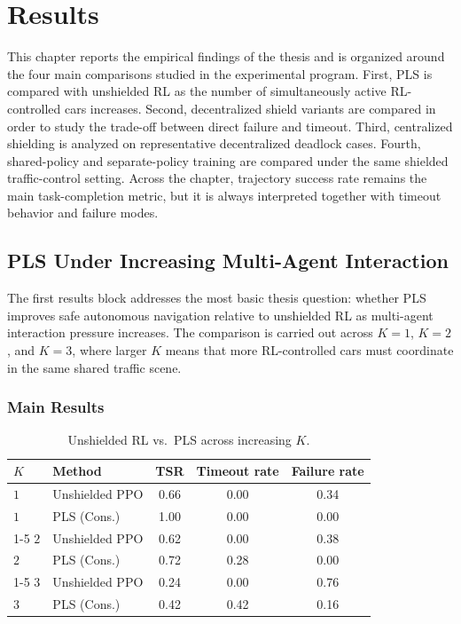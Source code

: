 \chapter{Results}
\label{cha:results}

This chapter reports the empirical findings of the thesis and is organized around the four main comparisons studied in the experimental program. First, PLS is compared with unshielded RL as the number of simultaneously active RL-controlled cars increases. Second, decentralized shield variants are compared in order to study the trade-off between direct failure and timeout. Third, centralized shielding is analyzed on representative decentralized deadlock cases. Fourth, shared-policy and separate-policy training are compared under the same shielded traffic-control setting. Across the chapter, trajectory success rate remains the main task-completion metric, but it is always interpreted together with timeout behavior and failure modes.

\section{PLS Under Increasing Multi-Agent Interaction}
\label{sec:results-rq1}

The first results block addresses the most basic thesis question: whether PLS improves safe autonomous navigation relative to unshielded RL as multi-agent interaction pressure increases. The comparison is carried out across \(K=1\), \(K=2\), and \(K=3\), where larger \(K\) means that more RL-controlled cars must coordinate in the same shared traffic scene.

\subsection{Main Results}
\begin{table}[H]
\centering
\caption{Unshielded RL vs.\ PLS across increasing \(K\).}
\label{tab:results-rq1-main}
\begin{tabular}{llccc}
\toprule
\textbf{\(K\)} & \textbf{Method} & \textbf{TSR} & \textbf{Timeout rate} & \textbf{Failure rate} \\
\midrule
\(1\) & Unshielded PPO & 0.66 & 0.00 & 0.34 \\
\(1\) & PLS (Cons.) & 1.00 & 0.00 & 0.00 \\
\cmidrule(lr){1-5}
\(2\) & Unshielded PPO & 0.62 & 0.00 & 0.38 \\
\(2\) & PLS (Cons.) & 0.72 & 0.28 & 0.00 \\
\cmidrule(lr){1-5}
\(3\) & Unshielded PPO & 0.24 & 0.00 & 0.76 \\
\(3\) & PLS (Cons.) & 0.42 & 0.42 & 0.16 \\
\bottomrule
\end{tabular}
\end{table}

